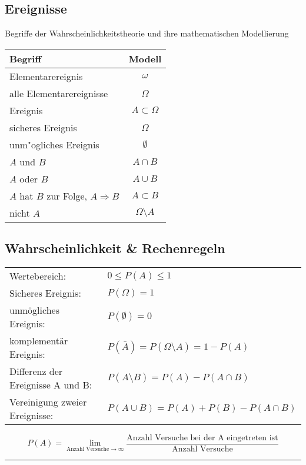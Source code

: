 \vspace{.5cm}
\begin{minipage}[t]{6.5cm}
\subsection{Ereignisse \skript{\pageref{sk-section-begriffe}}}
Begriffe der Wahrscheinlichkeitstheorie und ihre mathematischen
Modellierung\\
\begin{tabular}{|l|c|}
\hline
Begriff&Modell\\
\hline
Elementarereignis&$\omega$\\
alle Elementarereignisse&$\Omega$\\
Ereignis&$A\subset\Omega$\\
sicheres Ereignis&$\Omega$\\
unm"ogliches Ereignis&$\emptyset$\\
$A$ und $B$&$A\cap B$\\
$A$ oder $B$&$A\cup B$\\
$A$ hat $B$ zur Folge, $A\Rightarrow B$&$A\subset B$\\
nicht $A$&$\Omega\setminus A$\\
\hline
\end{tabular}
\end{minipage}
\hspace{.5cm}
\begin{minipage}[t]{9cm}
\subsection{Wahrscheinlichkeit \& Rechenregeln \skript{\pageref{sk-begriffe-zusammenfassung}}}
\begin{tabular}{ll}
  Wertebereich: & ${0}\le{P(A)}\le{1}$\\
  Sicheres Ereignis:    & $P(\Omega)=1$\\
  unmögliches Ereignis: & $P(\emptyset)=0$\\
  komplementär Ereignis: & $P(\bar{A})=P({\Omega}\setminus{A})=1-P(A)$\\
  Differenz der Ereignisse A und B: & $P({A}\setminus{B})=P(A)-P({A}\cap{B})$\\
  Vereinigung zweier Ereignisse: & $P({A}\cup{B})=P(A)+P(B)-P({A}\cap{B})$\\
\end{tabular}

\[P(A)=\lim\limits_{\text{Anzahl Versuche} \to \infty} \dfrac{\text{Anzahl Versuche bei der A eingetreten ist}}{\text{Anzahl Versuche}}
\]
\end{minipage}
\vspace{.5cm}
\hrule

